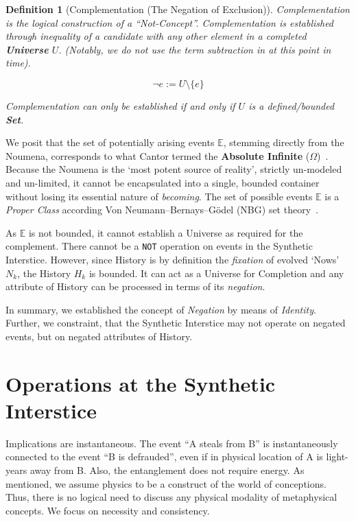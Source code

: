 \documentclass[11pt, a4paper]{article}
\theoremstyle{formalism}
\newtheorem{formalism}{Definition}
\begin{document}
\begin{formalism}[Complementation (The Negation of Exclusion)]
    Complementation is the logical construction of a ``Not-Concept''. 
    Complementation is established through inequality of a candidate
    with any other element in a completed \textbf{Universe} $U$.
    (Notably, we do not use the term subtraction in at this point in time).
    
    \begin{equation}
        \neg e := U \setminus \{e\}
    \end{equation}
    
    Complementation can only be established if and only if $U$ 
    is a defined/bounded \textbf{Set}. 
\end{formalism}

We posit that the set of potentially arising events $\mathbb{E}$, stemming
directly from the Noumena, corresponds to what Cantor termed the
\textbf{Absolute Infinite} ($\Omega$)~\cite{Cantor1899}. Because the Noumena is
the `most potent source of reality', strictly un-modeled and un-limited, it
cannot be encapsulated into a single, bounded container without losing its
essential nature of \textit{becoming}. The set of possible events $\mathbb{E}$
is a {\it Proper Class\/} according Von Neumann–Bernays–Gödel (NBG) set
theory~\cite{VonNeumann1925}.

As $\mathbb{E}$ is not bounded, it cannot establish a Universe as required for
the complement. There cannot be a {\tt NOT} operation on events in the
Synthetic Interstice. However, since History is by definition the {\it fixation\/}
of evolved `Nows' $N_k$, the History $H_k$ is bounded. It can act as a Universe
for Completion and any attribute of History can be processed in terms of its
{\it negation}.

In summary, we established the concept of {\it Negation\/} by means of {\it Identity}.
Further, we constraint, that the Synthetic Interstice may not operate on negated
events, but on negated attributes of History.

\section{Operations at the Synthetic Interstice}

Implications are instantaneous. The event ``A steals from B'' is
instantaneously connected to the event ``B is defrauded'', even if in physical
location of A is light-years away from B. Also, the entanglement does not require
energy. As mentioned, we assume physics to be a construct of the world of
conceptions. Thus, there is no logical need to discuss any physical
modality of metaphysical concepts. We focus on necessity and consistency. 
\end{document}
